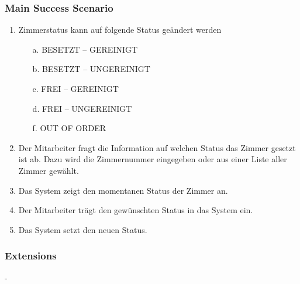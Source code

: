 \documentclass[./detailed_overview_usecases.tex]{subfiles}
\begin{document}
    \subsubsection*{Main Success Scenario}
    \begin{enumerate}
        \item Zimmerstatus kann auf folgende Status geändert werden
        \begin{itemize}
            \item[a.] BESETZT – GEREINIGT
            \item[b.] BESETZT – UNGEREINIGT
            \item[c.] FREI – GEREINIGT
            \item[d.] FREI – UNGEREINIGT
            \item[f.] OUT OF ORDER
        \end{itemize}
        \item Der Mitarbeiter fragt die Information auf welchen Status das Zimmer gesetzt ist ab. Dazu wird die Zimmernummer eingegeben oder aus einer Liste aller Zimmer gewählt.
        \item Das System zeigt den momentanen Status der Zimmer an.
        \item Der Mitarbeiter trägt den gewünschten Status in das System ein.
        \item Das System setzt den neuen Status.
    \end{enumerate}

    \subsubsection*{Extensions}
    -
\end{document}
